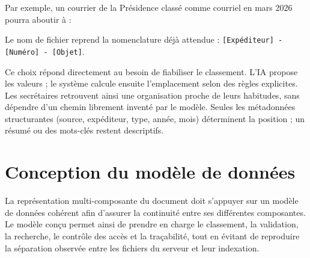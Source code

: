 Par exemple, un courrier de la Présidence classé comme courriel en mars 2026 pourra aboutir à :
\begin{center}
\begingroup
{}
\endgroup
\end{center}

Le nom de fichier reprend la nomenclature déjà attendue : \texttt{[Expéditeur] - [Numéro] - [Objet]}.

Ce choix répond directement au besoin de fiabiliser le classement. L'IA propose les valeurs ; le système calcule ensuite l'emplacement selon des règles explicites. Les secrétaires retrouvent ainsi une organisation proche de leurs habitudes, sans dépendre d'un chemin librement inventé par le modèle. Seules les métadonnées structurantes (source, expéditeur, type, année, mois) déterminent la position ; un résumé ou des mots-clés restent descriptifs.

\section{Conception du modèle de données}

La représentation multi-composante du document doit s'appuyer sur un modèle de données cohérent afin d'assurer la continuité entre ses différentes composantes. Le modèle conçu permet ainsi de prendre en charge le classement, la validation, la recherche, le contrôle des accès et la traçabilité, tout en évitant de reproduire la séparation observée entre les fichiers du serveur et leur indexation.

